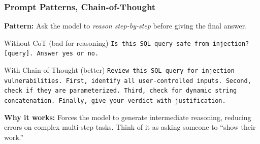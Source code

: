 %
%

\begin{frame}[fragile]\frametitle{Prompt Patterns, Chain-of-Thought}
\textbf{Pattern:} Ask the model to \textit{reason step-by-step} before giving the final answer.

\begin{block}{Without CoT (bad for reasoning)}
\texttt{Is this SQL query safe from injection? [query]. Answer yes or no.}
\end{block}

\begin{block}{With Chain-of-Thought (better)}
\texttt{Review this SQL query for injection vulnerabilities. First, identify all user-controlled inputs. Second, check if they are parameterized. Third, check for dynamic string concatenation. Finally, give your verdict with justification.}
\end{block}

\textbf{Why it works:} Forces the model to generate intermediate reasoning, reducing errors on complex multi-step tasks. Think of it as asking someone to ``show their work.''
\end{frame}

